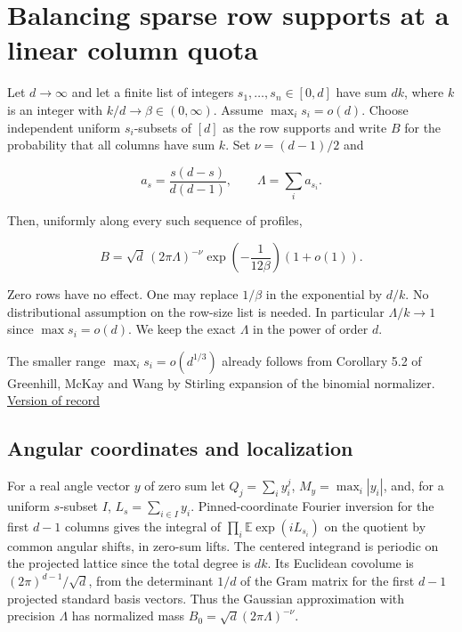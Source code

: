 \section{Balancing sparse row supports at a linear column quota}\label{sec:sparse-fixed-profile-edgeworth}

Let $d\to\infty$ and let a finite list of integers $s_1,\ldots,s_n\in[0,d]$ have sum $dk$, where $k$ is an integer with $k/d\to\beta\in(0,\infty)$. Assume $\max_i s_i=o(d)$. Choose independent uniform $s_i$-subsets of $[d]$ as the row supports and write $B$ for the probability that all columns have sum $k$. Set $\nu=(d-1)/2$ and

\begin{equation*}
a_s=\frac{s(d-s)}{d(d-1)},\qquad \Lambda=\sum_i a_{s_i}.
\end{equation*}

Then, uniformly along every such sequence of profiles,

\begin{equation*}
B=\sqrt d\,(2\pi\Lambda)^{-\nu}
\exp\!\left(-\frac{1}{12\beta}\right)(1+o(1)).
\end{equation*}

Zero rows have no effect. One may replace $1/\beta$ in the exponential by $d/k$. No distributional assumption on the row-size list is needed. In particular $\Lambda/k\to1$ since $\max s_i=o(d)$. We keep the exact $\Lambda$ in the power of order $d$.

The smaller range $\max_i s_i=o(d^{1/3})$ already follows from Corollary 5.2 of Greenhill, McKay and Wang by Stirling expansion of the binomial normalizer. \href{https://doi.org/10.1016/j.jcta.2005.03.005}{Version of record}

\subsection{Angular coordinates and localization}

For a real angle vector $y$ of zero sum let $Q_j=\sum_i y_i^j$, $M_y=\max_i|y_i|$, and, for a uniform $s$-subset $I$, $L_s=\sum_{i\in I}y_i$. Pinned-coordinate Fourier inversion for the first $d-1$ columns gives the integral of $\prod_i\mathbb E\exp(iL_{s_i})$ on the quotient by common angular shifts, in zero-sum lifts. The centered integrand is periodic on the projected lattice since the total degree is $dk$. Its Euclidean covolume is $(2\pi)^{d-1}/\sqrt d$, from the determinant $1/d$ of the Gram matrix for the first $d-1$ projected standard basis vectors. Thus the Gaussian approximation with precision $\Lambda$ has normalized mass $B_0=\sqrt d(2\pi\Lambda)^{-\nu}$.

